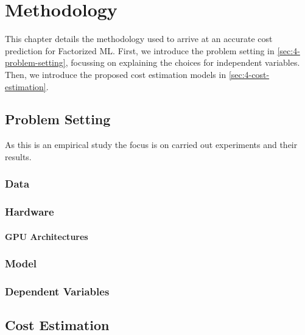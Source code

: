
\chapter{Methodology}

\label{chapter:methodology}

This chapter details the methodology used to arrive at an accurate cost prediction for Factorized ML. First, we introduce the problem setting in \autoref{sec:4-problem-setting}, focussing on explaining the choices for independent variables. Then, we introduce the proposed cost estimation models in \autoref{sec:4-cost-estimation}.

\section{Problem Setting}
\label{sec:4-problem-setting}

As this is an empirical study the focus is on carried out experiments and their results.

\subsection{Data}


\subsection{Hardware}
\subsubsection{GPU Architectures}

\subsection{Model}

\subsection{Dependent Variables}


\section{Cost Estimation}
\label{sec:4-cost-estimation}

